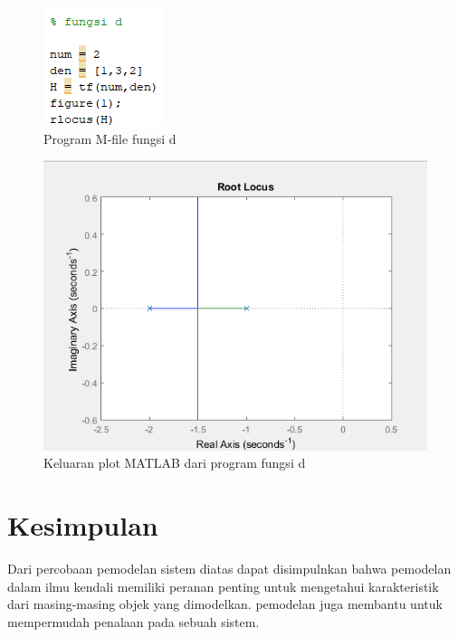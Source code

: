 \documentclass[12pt]{journal}
\begin{document}
\begin{figure}[H]
    \centering
    \includegraphics{7_d.png}
    \caption{Program M-file fungsi d}
    \label{soal_d}
\end{figure}
\begin{figure}[H]
    \centering
    \includegraphics[width=\textwidth]{hasil_7_d.png}
    \caption{Keluaran plot MATLAB dari program fungsi d}
    \label{hasil_d}
\end{figure}

\section{Kesimpulan}

Dari percobaan pemodelan sistem diatas dapat disimpulnkan bahwa pemodelan dalam ilmu kendali memiliki peranan penting untuk mengetahui karakteristik dari masing-masing objek yang dimodelkan. pemodelan juga membantu untuk mempermudah penalaan pada sebuah sistem.
\end{document}
